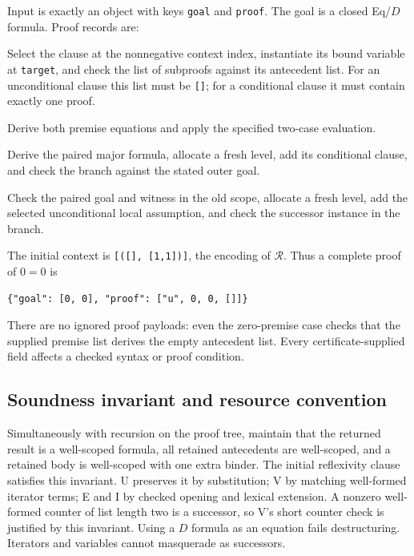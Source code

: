 \documentclass[11pt,letterpaper]{article}
\theoremstyle{definition}\newtheorem{definition}[theorem]{Definition}
\begin{document}
Input is exactly an object with keys \texttt{goal} and \texttt{proof}.
The goal is a closed Eq/$D$ formula. Proof records are:
\begin{description}[style=nextline,leftmargin=2em]
\item[\texttt{["u", index, target, premises]}]
Select the clause at the nonnegative context index, instantiate its bound
variable at \texttt{target}, and check the list of subproofs against its
antecedent list. For an unconditional clause this list must be \texttt{[]};
for a conditional clause it must contain exactly one proof.
\item[\texttt{["v", first, second]}]
Derive both premise equations and apply the specified two-case evaluation.
\item[\texttt{["e", goal, major, branch]}]
Derive the paired major formula, allocate a fresh level, add its conditional
clause, and check the branch against the stated outer goal.
\item[\texttt{["i", goal, witness, branch]}]
Check the paired goal and witness in the old scope, allocate a fresh level,
add the selected unconditional local assumption, and check the successor
instance in the branch.
\end{description}

The initial context is \texttt{[([], [1,1])]}, the encoding of
$\mathcal R$. Thus a complete proof of $0=0$ is
\begin{lstlisting}
{"goal": [0, 0], "proof": ["u", 0, 0, []]}
\end{lstlisting}
There are no ignored proof payloads: even the zero-premise case checks that
the supplied premise list derives the empty antecedent list. Every
certificate-supplied field affects a checked syntax or proof condition.

\subsection{Soundness invariant and resource convention}

Simultaneously with recursion on the proof tree, maintain that the returned
result is a well-scoped formula, all retained antecedents are well-scoped,
and a retained body is well-scoped with one extra binder. The initial
reflexivity clause satisfies this invariant. U preserves it by substitution;
V by matching well-formed iterator terms; E and I by checked opening and
lexical extension. A nonzero well-formed counter of list length two is a
successor, so V's short counter check is justified by this invariant. Using
a $D$ formula as an equation fails destructuring. Iterators and variables
cannot masquerade as successors.
\end{document}
